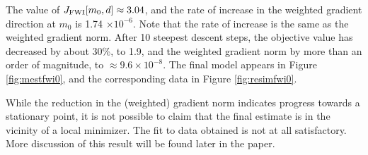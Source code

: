 The value of $J_{\rm FWI}[m_0,d] \approx 3.04$, and the rate of
increase in the weighted gradient direction at $m_0$ is 1.74 $\times
10^{-6}$. Note that the rate of increase is the same as the weighted
gradient norm. After 10 steepest descent steps, the objective value has
decreased by about 30\%, to 1.9, and the weighted gradient norm by
more than an order of magnitude, to $\approx 9.6 \times 10^{-8}$. The
final model appears in Figure \ref{fig:mestfwi0}, and the
corresponding data in Figure \ref{fig:resimfwi0}.




While the reduction in the (weighted) gradient norm indicates progress
towards a stationary point, it is not possible to claim that the final
estimate is in the vicinity of a local minimizer. The fit to data
obtained is not at all satisfactory. More discussion of this result
will be found later in the paper.



